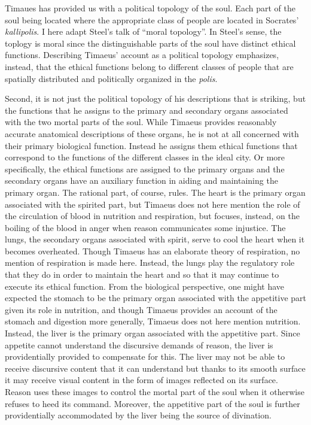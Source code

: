 Timaues has provided us with a political topology of the soul. Each part of the soul being located where the appropriate class of people are located in Socrates' \emph{kallipolis}. I here adapt Steel's \citeyearpar{Steel:2001ay} talk of ``moral topology''. In Steel's sense, the toplogy is moral since the distinguishable parts of the soul have distinct ethical functions. Describing Timaeus' account as a political topology emphasizes, instead, that the ethical functions belong to different classes of people that are spatially distributed and politically organized in the \emph{polis}.

Second, it is not just the political topology of his descriptions that is striking, but the functions that he assigns to the primary and secondary organs associated with the two mortal parts of the soul. While Timaeus provides reasonably accurate anatomical descriptions of these organs, he is not at all concerned with their primary biological function. Instead he assigns them ethical functions that correspond to the functions of the different classes in the ideal city. Or more specifically, the ethical functions are assigned to the primary organs and the secondary organs have an auxiliary function in aiding and maintaining the primary organ. The rational part, of course, rules. The heart is the primary organ associated with the spirited part, but Timaeus does not here mention the role of the circulation of blood in nutrition and respiration, but focuses, instead, on the boiling of the blood in anger when reason communicates some injustice. The lungs, the secondary organs associated with spirit, serve to cool the heart when it becomes overheated. Though Timaeus has an elaborate theory of respiration, no mention of respiration is made here. Instead, the lungs play the regulatory role that they do in order to maintain the heart and so that it may continue to execute its ethical function. From the biological perspective, one might have expected the stomach to be the primary organ associated with the appetitive part given its role in nutrition, and though Timaeus provides an account of the stomach and digestion more generally, Timaeus does not here mention nutrition. Instead, the liver is the primary organ associated with the appetitive part. Since appetite cannot understand the discursive demands of reason, the liver is providentially provided to compensate for this. The liver may not be able to receive discursive content that it can understand but thanks to its smooth surface it may receive visual content in the form of images reflected on its surface. Reason uses these images to control the mortal part of the soul when it otherwise refuses to heed its command. Moreover, the appetitive part of the soul is further providentially accommodated by the liver being the source of divination.

